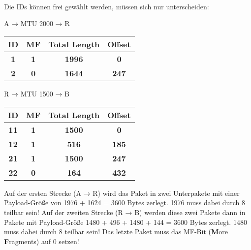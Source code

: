 
Die IDs können frei gewählt werden, müssen sich nur unterscheiden:

\bigskip

\begin{minipage}[c]{0.45\textwidth}
    A → MTU 2000 → R
    \centering
    \begin{tabular}{|c|c|c|c|}
        \hline
        ID & MF & Total Length & Offset \tabularnewline
        \hline
        \textbf{1} & \textbf{1} & \textbf{1996} & \textbf{0} \tabularnewline
        \hline
        \textbf{2} & \textbf{0} & \textbf{1644} & \textbf{247} \tabularnewline
        \hline
    \end{tabular}
\end{minipage}
\begin{minipage}{0.5\textwidth}
    R → MTU 1500 → B
    \centering
    \begin{tabular}{|c|c|c|c|}
        \hline
        ID & MF & Total Length & Offset \tabularnewline
        \hline
        \textbf{11} & \textbf{1} & \textbf{1500} & \textbf{0} \tabularnewline
        \hline
        \textbf{12} & \textbf{1} & \textbf{516}  & \textbf{185} \tabularnewline
        \hline
        \textbf{21} & \textbf{1} & \textbf{1500} & \textbf{247} \tabularnewline
        \hline
        \textbf{22} & \textbf{0} & \textbf{164}  & \textbf{432} \tabularnewline
        \hline
    \end{tabular}
\end{minipage}

\medskip

Auf der ersten Strecke (A → R) wird das Paket in zwei Unterpakete mit einer Payload-Größe von 1976 + 1624 = 3600 Bytes zerlegt.
1976 muss dabei durch 8 teilbar sein!
Auf der zweiten Strecke (R → B) werden diese zwei Pakete dann in Pakete mit Payload-Größe 1480 + 496 + 1480 + 144 = 3600 Bytes zerlegt.
1480 muss dabei durch 8 teilbar sein!
Das letzte Paket muss das MF-Bit (\textbf{M}ore \textbf{F}ragments) auf 0 setzen!